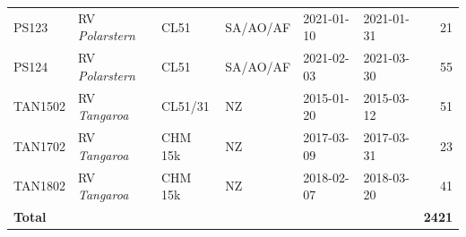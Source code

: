 \documentclass[draft]{agujournal2019}
\begin{document}
\begin{table}[p!]
\begin{tabular}{llllllr}
PS123    & RV \emph{Polarstern}          & CL51    & SA/AO/AF & 2021-01-10 & 2021-01-31 & 21 \\
PS124    & RV \emph{Polarstern}          & CL51    & SA/AO/AF & 2021-02-03 & 2021-03-30 & 55 \\
TAN1502  & RV \emph{Tangaroa}            & CL51/31 & NZ       & 2015-01-20 & 2015-03-12 & 51 \\
TAN1702  & RV \emph{Tangaroa}            & CHM 15k & NZ       & 2017-03-09 & 2017-03-31 & 23 \\
TAN1802  & RV \emph{Tangaroa}            & CHM 15k & NZ       & 2018-02-07 & 2018-03-20 & 41 \\
\hline
\textbf{Total} &                         &         &          &            &            & \textbf{2421}\\
\hline
\end{tabular}
\normalsize
\end{table}
\end{document}
